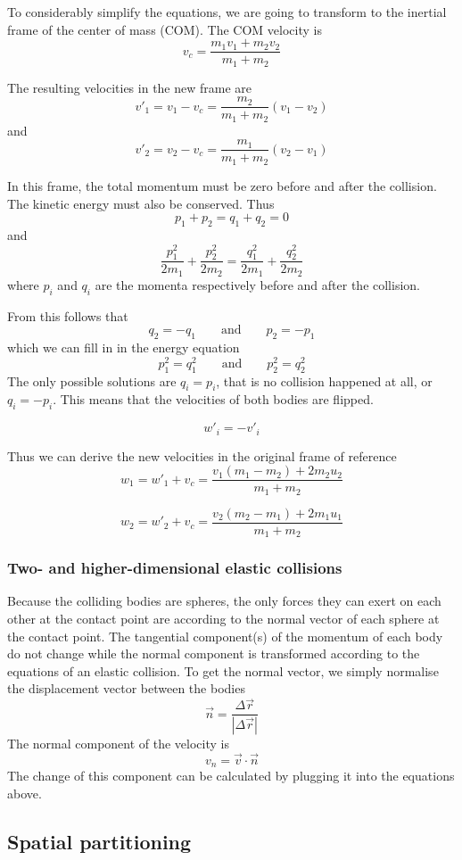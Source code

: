 To considerably simplify the equations, we are going to transform to the 
inertial frame of the center of mass (COM). The COM velocity is
$$
v_c = \frac{m_1 v_1 + m_2 v_2}{m_1 + m_2}
$$

The resulting velocities in the new frame are
$$
v'_1 = v_1 - v_c = \frac{m_2}{m_1+m_2}(v_1-v_2)
$$
and
$$
v'_2 = v_2 - v_c = \frac{m_1}{m_1+m_2}(v_2-v_1)
$$

In this frame, the total momentum must be zero before and after the collision.  
The kinetic energy must also be conserved.
Thus
$$
p_1 + p_2 = q_1 + q_2 = 0
$$
and
$$
\frac{p_1^2}{2m_1} + \frac{p_2^2}{2m_2} = \frac{q_1^2}{2m_1} + 
\frac{q_2^2}{2m_2}
$$
where $p_i$ and $q_i$ are the momenta respectively before and after the 
collision.

From this follows that
$$
q_2 = -q_1 \qquad \textrm{and} \qquad p_2 = -p_1
$$
which we can fill in in the energy equation
$$
p_1^2 = q_1^2 \qquad \textrm{and} \qquad p_2^2 = q_2^2
$$
The only possible solutions are $q_i = p_i$, that is no collision happened at 
all, or $q_i = -p_i$. This means that the velocities of both bodies are 
flipped.

$$
w'_i = -v'_i
$$

Thus we can derive the new velocities in the original frame of reference
$$
w_1 = w'_1 + v_c = \frac{v_1(m_1-m_2) + 2m_2u_2}{m_1+m_2}
$$

$$
w_2 = w'_2 + v_c = \frac{v_2(m_2-m_1) + 2m_1u_1}{m_1+m_2}
$$

\subsubsection{Two- and higher-dimensional elastic collisions}
Because the colliding bodies are spheres, the only forces they can exert on 
each other at the contact point are according to the normal vector of each 
sphere at the contact point. The tangential component(s) of the momentum of 
each body do not change while the normal component is transformed according to 
the equations of an elastic collision. To get the normal vector, we simply 
normalise the displacement vector between the bodies
$$
\vec{n} = \frac{\Delta\vec{r}}{|\Delta\vec{r}|}
$$
The normal component of the velocity is
$$
v_n = \vec{v} \cdot \vec{n}
$$
The change of this component can be calculated by plugging it into the 
equations above.

\subsection{Spatial partitioning}

